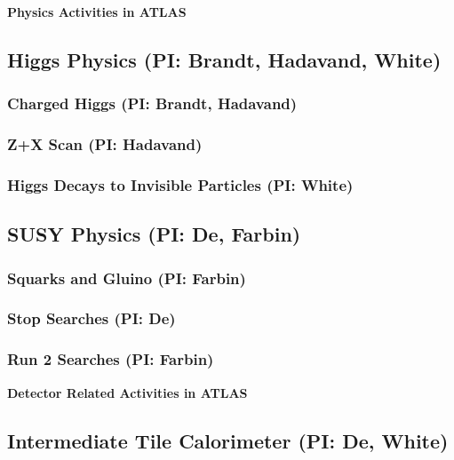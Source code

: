 \documentclass[11pt]{article}
\def\twohead#1{\subsection{#1}}
\def\threehead#1{\subsubsection{#1}}
\def\centerhead#1{
	\begin{center}
	\Large\textbf{#1}
	\end{center}}
\begin{document}




\centerhead{Physics Activities in ATLAS}

\twohead{Higgs Physics (PI: Brandt, Hadavand, White)}



\threehead{Charged Higgs (PI: Brandt, Hadavand)}


\threehead{Z+X Scan (PI: Hadavand)}


\threehead{Higgs Decays to Invisible Particles (PI: White)}


\twohead{SUSY Physics (PI: De, Farbin)}



\threehead{Squarks and Gluino (PI: Farbin)}


\threehead{Stop Searches (PI: De)}


\threehead{Run 2 Searches (PI: Farbin)}



\centerhead{Detector Related Activities in ATLAS}

\twohead{Intermediate Tile Calorimeter (PI: De, White)}

\end{document}
